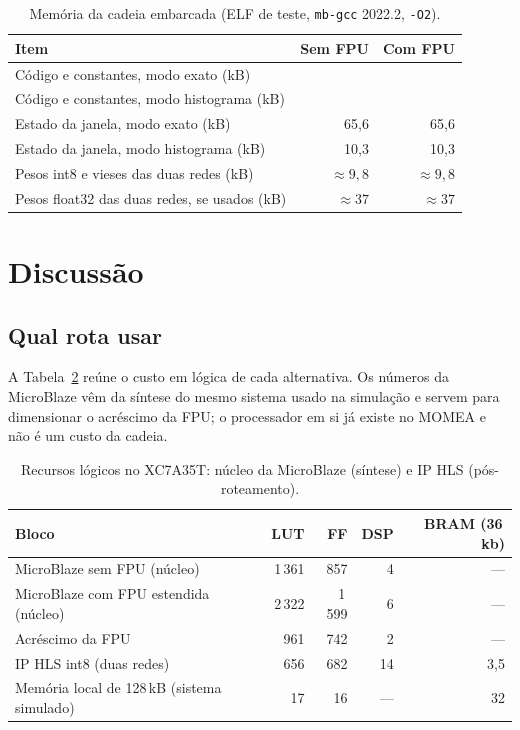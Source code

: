 \documentclass[12pt]{article}
\begin{document}
\begin{table}[htbp]
	\centering
	\small
	\caption{Memória da cadeia embarcada (ELF de teste, \texttt{mb-gcc} 2022.2, \texttt{-O2}).}
	\label{tab:memoria}
	\begin{tabular}{lrr}
		\toprule
		\textbf{Item} & \textbf{Sem FPU} & \textbf{Com FPU} \\
		\midrule
		Código e constantes, modo exato (kB) & \mbTextoExatoSoft & \mbTextoExatoFpu \\
		Código e constantes, modo histograma (kB) & \mbTextoHistSoft & \mbTextoHistFpu \\
		Estado da janela, modo exato (kB) & 65,6 & 65,6 \\
		Estado da janela, modo histograma (kB) & 10,3 & 10,3 \\
		Pesos int8 e vieses das duas redes (kB) & \(\approx 9{,}8\) & \(\approx 9{,}8\) \\
		Pesos float32 das duas redes, se usados (kB) & \(\approx 37\) & \(\approx 37\) \\
		\bottomrule
	\end{tabular}
\end{table}

\section{Discussão}
\label{sec:discussao}

\subsection{Qual rota usar}

A Tabela~\ref{tab:rotas} reúne o custo em lógica de cada alternativa. Os números da MicroBlaze vêm da síntese do mesmo sistema usado na simulação e servem para dimensionar o acréscimo da FPU; o processador em si já existe no MOMEA e não é um custo da cadeia.

\begin{table}[htbp]
	\centering
	\small
	\caption{Recursos lógicos no XC7A35T: núcleo da MicroBlaze (síntese) e IP HLS (pós-roteamento).}
	\label{tab:rotas}
	\begin{tabular}{lrrrr}
		\toprule
		\textbf{Bloco} & \textbf{LUT} & \textbf{FF} & \textbf{DSP} & \textbf{BRAM (36\,kb)} \\
		\midrule
		MicroBlaze sem FPU (núcleo) & 1\,361 & 857 & 4 & --- \\
		MicroBlaze com FPU estendida (núcleo) & 2\,322 & 1\,599 & 6 & --- \\
		Acréscimo da FPU & 961 & 742 & 2 & --- \\
		IP HLS int8 (duas redes) & 656 & 682 & 14 & 3,5 \\
		Memória local de 128\,kB (sistema simulado) & 17 & 16 & --- & 32 \\
		\bottomrule
	\end{tabular}
\end{table}
\end{document}
